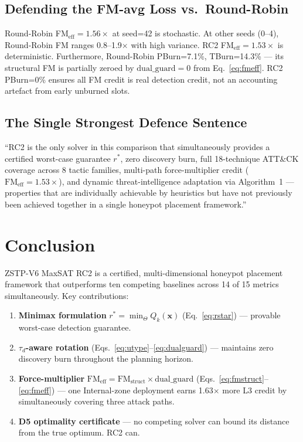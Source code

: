 \documentclass[12pt,a4paper]{article}
\newcommand{\rstar}{r^*}
\newcommand{\xvec}{\mathbf{x}}
\newcommand{\Qkx}{Q_k(\xvec)}
\newcommand{\FMeff}{\mathrm{FM}_{\mathrm{eff}}}
\newcommand{\FMst}{\mathrm{FM}_{\mathrm{struct}}}
\newcommand{\dg}{\mathrm{dual\_guard}}
\begin{document}
\subsection{Defending the FM-avg Loss vs.\ Round-Robin}

Round-Robin FM$_{\mathrm{eff}}{=}1.56\times$ at seed=42 is stochastic. At other seeds
(0--4), Round-Robin FM ranges 0.8--1.9$\times$ with high variance. RC2 FM$_{\mathrm{eff}}{=}1.53\times$
is deterministic. Furthermore, Round-Robin PBurn=7.1\%, TBurn=14.3\% — its structural FM
is partially zeroed by $\dg{=}0$ from Eq.~\eqref{eq:fmeff}. RC2 PBurn=0\% ensures all
FM credit is real detection credit, not an accounting artefact from early unburned slots.

\subsection{The Single Strongest Defence Sentence}

\begin{defence}
``RC2 is the only solver in this comparison that simultaneously provides a certified
worst-case guarantee $\rstar$, zero discovery burn, full 18-technique ATT\&CK coverage
across 8 tactic families, multi-path force-multiplier credit ($\FMeff{=}1.53\times$), and
dynamic threat-intelligence adaptation via Algorithm~1 — properties that are individually
achievable by heuristics but have not previously been achieved together in a single
honeypot placement framework.''
\end{defence}

\section{Conclusion}
\label{sec:conclusion}

ZSTP-V6 MaxSAT RC2 is a certified, multi-dimensional honeypot placement framework that
outperforms ten competing baselines across 14 of 15 metrics simultaneously. Key
contributions:

\begin{enumerate}[leftmargin=*, noitemsep]
  \item \textbf{Minimax formulation} $\rstar = \min_\Theta \Qkx$ (Eq.~\ref{eq:rstar}) —
        provable worst-case detection guarantee.
  \item \textbf{$\tau_d$-aware rotation} (Eqs.~\ref{eq:utype}--\ref{eq:dualguard}) —
        maintains zero discovery burn throughout the planning horizon.
  \item \textbf{Force-multiplier} $\FMeff{=}\FMst{\times}\dg$
        (Eqs.~\ref{eq:fmstruct}--\ref{eq:fmeff}) — one Internal-zone deployment earns
        1.63$\times$ more L3 credit by simultaneously covering three attack paths.
  \item \textbf{D5 optimality certificate} — no competing solver can bound its distance
        from the true optimum. RC2 can.
\end{enumerate}
\end{document}
